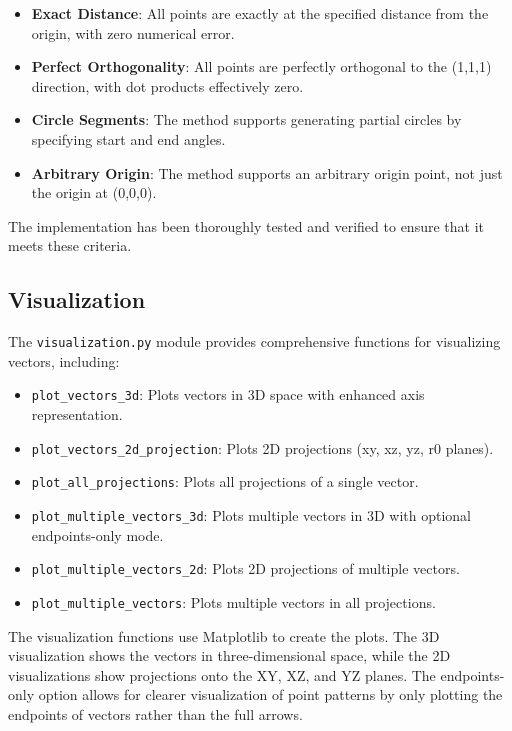 \begin{itemize}
    \item \textbf{Exact Distance}: All points are exactly at the specified distance from the origin, with zero numerical error.
    \item \textbf{Perfect Orthogonality}: All points are perfectly orthogonal to the (1,1,1) direction, with dot products effectively zero.
    \item \textbf{Circle Segments}: The method supports generating partial circles by specifying start and end angles.
    \item \textbf{Arbitrary Origin}: The method supports an arbitrary origin point, not just the origin at (0,0,0).
\end{itemize}

The implementation has been thoroughly tested and verified to ensure that it meets these criteria.

\subsection{Visualization}

The \texttt{visualization.py} module provides comprehensive functions for visualizing vectors, including:

\begin{itemize}
    \item \texttt{plot\_vectors\_3d}: Plots vectors in 3D space with enhanced axis representation.
    \item \texttt{plot\_vectors\_2d\_projection}: Plots 2D projections (xy, xz, yz, r0 planes).
    \item \texttt{plot\_all\_projections}: Plots all projections of a single vector.
    \item \texttt{plot\_multiple\_vectors\_3d}: Plots multiple vectors in 3D with optional endpoints-only mode.
    \item \texttt{plot\_multiple\_vectors\_2d}: Plots 2D projections of multiple vectors.
    \item \texttt{plot\_multiple\_vectors}: Plots multiple vectors in all projections.
\end{itemize}

The visualization functions use Matplotlib to create the plots. The 3D visualization shows the vectors in three-dimensional space, while the 2D visualizations show projections onto the XY, XZ, and YZ planes. The endpoints-only option allows for clearer visualization of point patterns by only plotting the endpoints of vectors rather than the full arrows.

